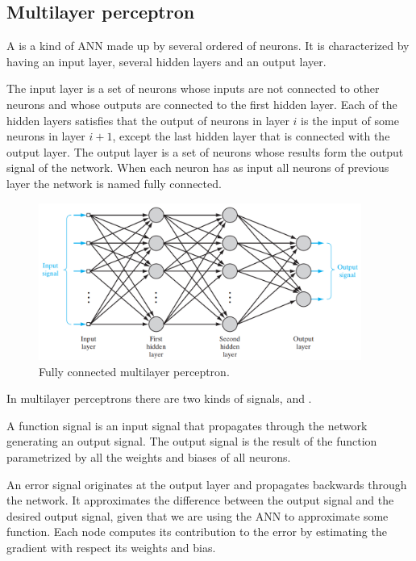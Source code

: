 \subsection{Multilayer perceptron}
A  is a kind of ANN made up by several ordered  of neurons.
It is characterized by having an input layer, several hidden layers and an output layer.

The input layer is a set of neurons whose inputs are not connected to other neurons and whose outputs are connected to
the first hidden layer.
Each of the hidden layers satisfies that the output of neurons in layer $i$ is the input of some neurons in layer $i+1$,
except the last hidden layer that is connected with the output layer.
The output layer is a set of neurons whose results form the output signal of the network.
When each neuron has as input all neurons of previous layer the network is named fully connected.

\begin{figure}[hbtp]
\begin{center}
\includegraphics[width=400]{img/multilayer_perceptron.png}
\end{center}
\caption[Multilayer perceptron diagram]
{Fully connected multilayer perceptron.}
\label{fig:FullyMP}
\end{figure}

In multilayer perceptrons there are two kinds of signals,  and .

A function signal is an input signal that propagates through the network generating an output signal.
The output signal is the result of the function parametrized by all the weights and biases of all neurons.

An error signal originates at the output layer and propagates backwards through the network.
It approximates the difference between the output signal and the desired output signal, given that we are using the \ac{ANN}
to approximate some function.
Each node computes its contribution to the error by estimating the gradient with respect its weights and bias.

